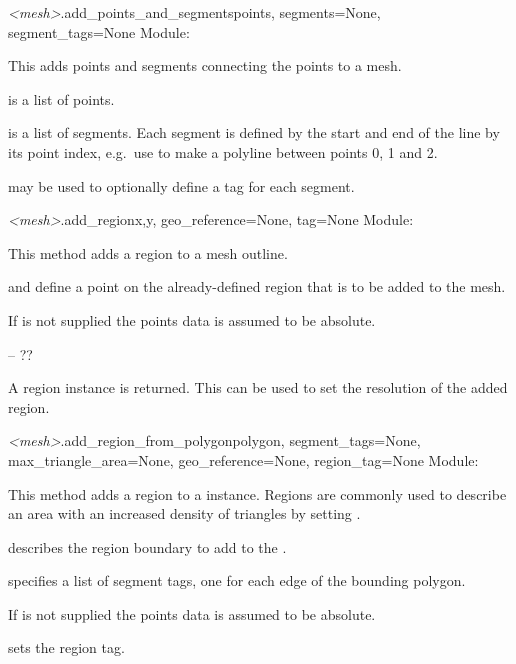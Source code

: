 \documentclass{manual}
\begin{document}
\begin{methoddesc}{\emph{<mesh>}.add_points_and_segments}{points,
                                                          segments=None,
                                                          segment_tags=None}
Module: 

This adds points and segments connecting the points to a mesh.

 is a list of points.

 is a list of segments.  Each segment is defined by the start and end
of the line by its point index, e.g.\ use  to make a
polyline between points 0, 1 and 2.

 may be used to optionally define a tag for each segment.
\end{methoddesc}

\begin{methoddesc}{\emph{<mesh>}.add_region}{x,y, geo_reference=None, tag=None}
Module: 

This method adds a region to a mesh outline.

 and  define a point on the already-defined region that is to 
be added to the mesh.

If  is not supplied the points data is assumed to be absolute.

 -- ??

A region instance is returned.  This can be used to set the resolution of the added region.
\end{methoddesc}

\begin{methoddesc}{\emph{<mesh>}.add_region_from_polygon}{polygon,
                                                          segment_tags=None,
                                                          max_triangle_area=None,
                                                          geo_reference=None,
                                                          region_tag=None}
Module: 

This method adds a region to a
 instance.  Regions are commonly used to describe an area
with an increased density of triangles by setting .

 describes the region boundary to add to the .

 specifies a list of segment tags, one for each edge of the
bounding polygon.

If  is not supplied the points data is assumed to be absolute.

 sets the region tag.
\end{methoddesc}
\end{document}
